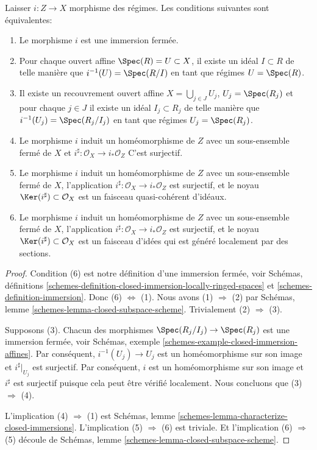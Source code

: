 \begin{lemma}

\label{lemma-closed-immersion}

Laisser $i : Z \to X$ morphisme des régimes. Les conditions suivantes sont équivalentes:

\begin{enumerate}

\item Le morphisme $i$ est une immersion fermée.
\item Pour chaque ouvert affine $\Spec(R) = U \subset X$, il existe un idéal $I \subset R$ de telle manière que
$i^{-1}(U) = \Spec(R/I)$ en tant que régimes $U = \Spec(R)$.
\item Il existe un recouvrement ouvert affine $X = \bigcup_{j \in J} U_j$,
$U_j = \Spec(R_j)$ et pour chaque $j \in J$ il existe un idéal $I_j \subset R_j$ de telle manière que
$i^{-1}(U_j) = \Spec(R_j/I_j)$ en tant que régimes $U_j = \Spec(R_j)$.
\item Le morphisme $i$ induit un homéomorphisme de $Z$ avec un sous-ensemble fermé de $X$ et $i^\sharp : \mathcal{O}_X \to i_*\mathcal{O}_Z$ C'est surjectif.
\item Le morphisme $i$ induit un homéomorphisme de $Z$ avec un sous-ensemble fermé de $X$, l'application $i^\sharp : \mathcal{O}_X \to i_*\mathcal{O}_Z$ est surjectif, et le noyau $\Ker(i^\sharp)\subset \mathcal{O}_X$ est un faisceau quasi-cohérent d'idéaux.
\item Le morphisme $i$ induit un homéomorphisme de $Z$ avec un sous-ensemble fermé de $X$, l'application $i^\sharp : \mathcal{O}_X \to i_*\mathcal{O}_Z$ est surjectif, et le noyau $\Ker(i^\sharp)\subset \mathcal{O}_X$ est un faisceau d'idées qui est généré localement par des sections.

\end{enumerate}

\end{lemma}

\begin{proof}
Condition (6) est notre définition d'une immersion fermée, voir Schémas, définitions \ref{schemes-definition-closed-immersion-locally-ringed-spaces} et \ref{schemes-definition-immersion}. Donc (6) $\Leftrightarrow$ (1). Nous avons (1) $\Rightarrow$ (2) par Schémas, lemme \ref{schemes-lemma-closed-subspace-scheme}. Trivialement (2) $\Rightarrow$ (3).

\medskip\noindent
Supposons (3). Chacun des morphismes $\Spec(R_j/I_j) \to \Spec(R_j)$ est une immersion fermée, voir Schémas, exemple \ref{schemes-example-closed-immersion-affines}. Par conséquent, $i^{-1}(U_j) \to U_j$ est un homéomorphisme sur son image et $i^\sharp|_{U_j}$ est surjectif. Par conséquent, $i$ est un homéomorphisme sur son image et $i^\sharp$ est surjectif puisque cela peut être vérifié localement. Nous concluons que (3) $\Rightarrow$ (4).

\medskip\noindent
L'implication (4) $\Rightarrow$ (1) est Schémas, lemme \ref{schemes-lemma-characterize-closed-immersions}. L'implication (5) $\Rightarrow$ (6) est triviale. Et l'implication (6) $\Rightarrow$ (5) découle de Schémas, lemme \ref{schemes-lemma-closed-subspace-scheme}.
\end{proof}


